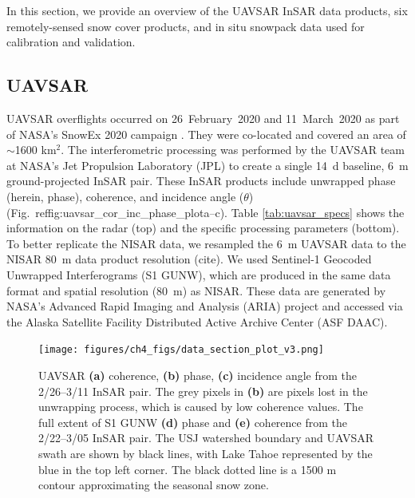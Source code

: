 In this section, we provide an overview of the UAVSAR InSAR data products, six remotely-sensed snow cover products, and in situ snowpack data used for calibration and validation.

\hypertarget{ch4-methods-1}{\subsection{UAVSAR}\label{ch4-methods-1}}

UAVSAR overflights occurred on 26~February~2020 and 11~March~2020 as part of NASA's SnowEx 2020 campaign \citep{marshallNASASnowEx20202019}. They were co-located and covered an area of $\sim$1600 km$^{2}$. The interferometric processing was performed by the UAVSAR team at NASA's Jet Propulsion Laboratory (JPL) to create a single 14~d baseline, 6~m ground-projected InSAR pair. These InSAR products include unwrapped phase (herein, phase), coherence, and incidence angle ($\theta$) (Fig.~ref{fig:uavsar_cor_inc_phase_plot}a--c). Table \ref{tab:uavsar_specs} shows the information on the radar (top) and the specific processing parameters (bottom). To better replicate the NISAR data, we resampled the 6~m UAVSAR data to the NISAR 80~m data product resolution (cite). We used Sentinel-1 Geocoded Unwrapped Interferograms (S1 GUNW), which are produced in the same data format and spatial resolution (80~m) as NISAR. These data are generated by NASA's Advanced Rapid Imaging and Analysis (ARIA) \citep{bekaertDevelopmentDisseminationStandardized2019,buzzangaSustainedMonitoringSubsidence2020} project and accessed via the Alaska Satellite Facility Distributed Active Archive Center (ASF DAAC).

\begin{figure}[ht]
\texttt{[image: figures/ch4\_figs/data\_section\_plot\_v3.png]}
\centering
\caption{UAVSAR \textbf{(a)} coherence, \textbf{(b)} phase, \textbf{(c)} incidence angle from the 2/26--3/11 InSAR pair. The grey pixels in \textbf{(b)} are pixels lost in the unwrapping process, which is caused by low coherence values. The full extent of S1 GUNW \textbf{(d)} phase and \textbf{(e)} coherence from the 2/22--3/05 InSAR pair. The USJ watershed boundary and UAVSAR swath are shown by black lines, with Lake Tahoe represented by the blue in the top left corner. The black dotted line is a 1500 m contour approximating the seasonal snow zone.}
\label{fig:uavsar_cor_inc_phase_plot}
\end{figure}
\clearpage

